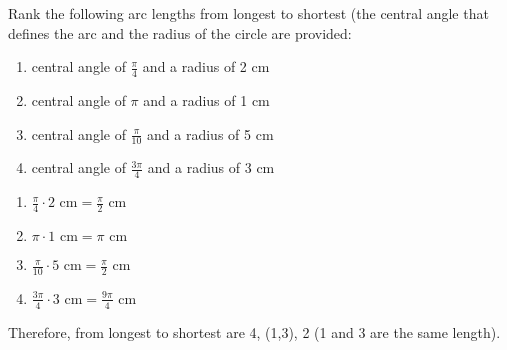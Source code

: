 \begin{Exercise}[title = {Arc Length Ranking}, label = radian2]
Rank the following arc lengths from longest to shortest (the central angle that defines the arc and the radius of the circle are provided:
\begin{enumerate}
\item central angle of $\frac{\pi}{4}$ and a radius of 2 cm
\item central angle of $\pi$ and a radius of 1 cm
\item central angle of $\frac{\pi}{10}$ and a radius of 5 cm
\item central angle of $\frac{3\pi}{4}$ and a radius of 3 cm
\end{enumerate}
\end{Exercise}

\begin{Answer}[ref = radian2]
\begin{enumerate}
\item $\frac{\pi}{4} \cdot 2\text{ cm} = \frac{\pi}{2}\text{ cm}$
\item $\pi \cdot 1\text{ cm} = \pi \text{ cm}$
\item $\frac{\pi}{10} \cdot 5\text{ cm} = \frac{\pi}{2}\text{ cm}$
\item $\frac{3\pi}{4} \cdot 3\text{ cm} = \frac{9\pi}{4}\text{ cm}$
\end{enumerate}
Therefore, from longest to shortest are 4, (1,3), 2 (1 and 3 are the same length).
\end{Answer}

